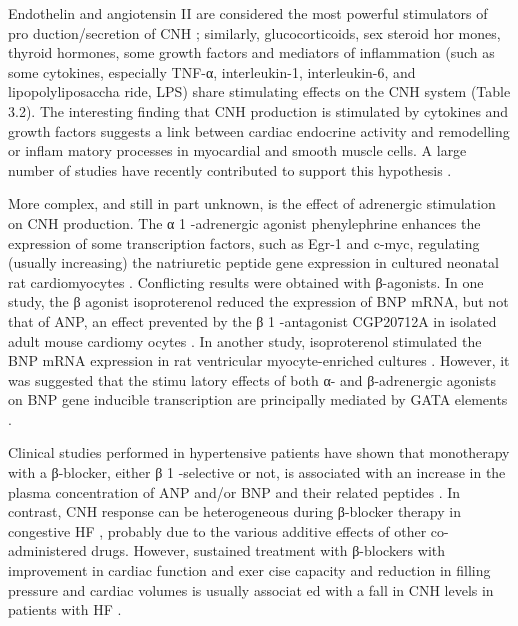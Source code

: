 \documentclass[14pt,a4paper,onecolumn]{extarticle}
\begin{document}
Endothelin and angiotensin II are considered the most powerful stimulators of pro duction/secretion of CNH \citep{12}\citep{13}\citep{18}\citep{22}; similarly, glucocorticoids, sex steroid hor mones, thyroid hormones, some growth factors and mediators of inflammation (such as some cytokines, especially TNF-α, interleukin-1, interleukin-6, and lipopolyliposaccha ride, LPS) share stimulating effects on the CNH system \citep{12}\citep{13}\citep{18}\citep{22}\citep{36}\citep{48-57} (Table 3.2). The interesting finding that CNH production is stimulated by cytokines and growth factors suggests a link between cardiac endocrine activity and remodelling or inflam matory processes in myocardial and smooth muscle cells. A large number of studies have recently contributed to support this hypothesis \citep{33-36}\citep{50-53}\citep{56-62}.

More complex, and still in part unknown, is the effect of adrenergic stimulation on CNH production. The α 1 -adrenergic agonist phenylephrine enhances the expression of some transcription factors, such as Egr-1 and c-myc, regulating (usually increasing) the natriuretic peptide gene expression in cultured neonatal rat cardiomyocytes \citep{12}\citep{13}\citep{18}\citep{63-66}. Conflicting results were obtained with β-agonists. In one study, the β agonist isoproterenol reduced the expression of BNP mRNA, but not that of ANP, an effect prevented by the β 1 -antagonist CGP20712A in isolated adult mouse cardiomy ocytes \citep{67}. In another study, isoproterenol stimulated the BNP mRNA expression in rat ventricular myocyte-enriched cultures \citep{68}. However, it was suggested that the stimu latory effects of both α- and β-adrenergic agonists on BNP gene inducible transcription are principally mediated by GATA elements \citep{22}\citep{23}.

Clinical studies performed in hypertensive patients have shown that monotherapy with a β-blocker, either β 1 -selective or not, is associated with an increase in the plasma concentration of ANP and/or BNP and their related peptides \citep{69-71}. In contrast, CNH response can be heterogeneous during β-blocker therapy in congestive HF \citep{28}\citep{72}, probably due to the various additive effects of other co-administered drugs. However, sustained treatment with β-blockers with improvement in cardiac function and exer cise capacity and reduction in filling pressure and cardiac volumes is usually associat ed with a fall in CNH levels in patients with HF \citep{28}\citep{73}\citep{74}.
\end{document}
